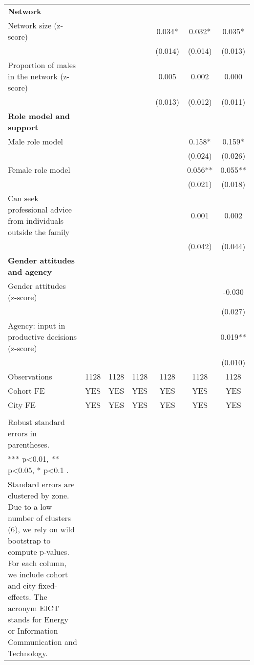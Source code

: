 \begin{landscape}
\begin{longtable}{m{9cm}cccccc}
\textbf{Network}&&&&&&\\
Network size (z-score)&&&&0.034*&0.032*&0.035*\\
&&&&(0.014)&(0.014)&(0.013)\\
Proportion of males in the network (z-score) &&&&0.005&0.002&0.000\\
&&&&(0.013)&(0.012)&(0.011)\\
\textbf{Role model and support}&&&&&&\\
Male role model&&&&&0.158*&0.159*\\
&&&&&(0.024)&(0.026)\\
Female role model&&&&&0.056**&0.055**\\
&&&&&(0.021)&(0.018)\\
Can seek professional advice from individuals outside the family &&&&&0.001&0.002\\
&&&&&(0.042)&(0.044)\\
\textbf{Gender attitudes and agency}&&&&&&\\
Gender attitudes (z-score)&&&&&&-0.030\\
&&&&&&(0.027)\\
Agency: input in productive decisions (z-score) &&&&&&0.019**\\
&&&&&&(0.010)\\
Observations&1128&1128&1128&1128&1128&1128\\
Cohort FE&YES&YES&YES&YES&YES&YES\\
City FE&YES&YES&YES&YES&YES&YES\\
\midrule
\begin{minipage}{21cm}
\small{
{\textit Notes:} \\
Robust standard errors in parentheses. \\
*** p\textless{}0.01, ** p\textless{}0.05, * p\textless{}0.1 . \\
Standard errors are clustered by zone. Due to a low number of clusters (6), we rely on wild bootstrap to compute p-values. For each column, we include cohort and city fixed-effects. The acronym EICT stands for Energy or Information Communication and Technology.
}
\end{minipage} \\* \bottomrule
\end{longtable}
\end{landscape}

